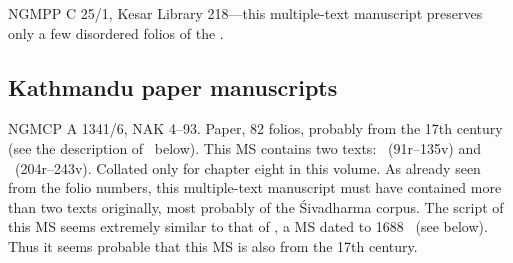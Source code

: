 NGMPP C 25/1, Kesar Library 218---this multiple-text manuscript
preserves only a few disordered folios of the \VSS.

\bigskip

\subsection{Kathmandu paper manuscripts}

NGMCP A 1341/6, NAK 4--93. Paper, 82 folios,
probably from the 17th century (see the
description of \msPaperC\ below). 
This MS contains two texts: 
\SDhSangr\ (\fols91r--135v) and 
\Vss\ (\fols204r--243v). Collated only for
chapter eight in this volume. As already seen
from the folio numbers, this multiple-text
manuscript must have contained more than two
texts originally, most probably of the
Śivadharma corpus. 
The script of this MS seems extremely similar to that 
of \msPaperC, a MS dated to 1688 \CE\ (see below).
Thus it seems probable that this MS is also
from the 17th century.

